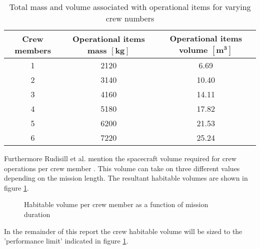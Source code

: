 \begin{table}[h!]
	\caption{Total mass and volume associated with operational items for varying crew numbers}
	\begin{tabular}{|c|c|c|}
		\hline
		\textbf{Crew members} & \textbf{Operational items mass $\mathbf{[kg]}$} & \textbf{Operational items volume $\mathbf{[m^{3}]}$}\\ \hline \hline
		1 & 2120 & 6.69\\
		2 & 3140 & 10.40\\
		3 & 4160 & 14.11\\
		4 & 5180 & 17.82\\
		5 & 6200 & 21.53\\
		6 & 7220 & 25.24\\ \hline
	\end{tabular}
	\label{tab:crewmemberops}
\end{table}
Furthermore Rudisill et al. mention the spacecraft volume required for crew operations per crew member \cite{Rudisill2008}. This volume can take on three different values depending on the mission length. The resultant habitable volumes are shown in figure \ref{fig:crewvolume}.
\begin{figure}[h]
	\centering
	\setlength{} 
	\setlength{}
	
	\caption[Habitable volume per crew member as a function of mission duration]{Habitable volume per crew member as a function of mission duration \cite{Rudisill2008}}
	\label{fig:crewvolume}
\end{figure}
In the remainder of this report the crew habitable volume will be sized to the 'performance limit' indicated in figure \ref{fig:crewvolume}.
